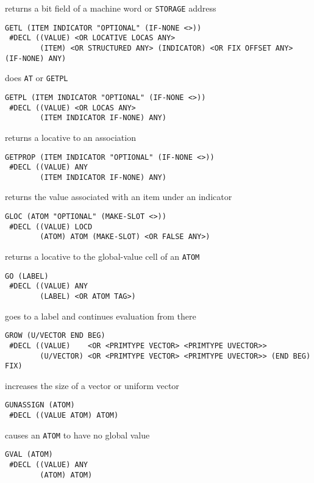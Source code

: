 \documentclass[a4paper,]{article}
\begin{document}
returns a bit field of a machine word or \texttt{STORAGE} address

\begin{verbatim}
GETL (ITEM INDICATOR "OPTIONAL" (IF-NONE <>))
 #DECL ((VALUE) <OR LOCATIVE LOCAS ANY>
        (ITEM) <OR STRUCTURED ANY> (INDICATOR) <OR FIX OFFSET ANY> (IF-NONE) ANY)
\end{verbatim}

does \texttt{AT} or \texttt{GETPL}

\begin{verbatim}
GETPL (ITEM INDICATOR "OPTIONAL" (IF-NONE <>))
 #DECL ((VALUE) <OR LOCAS ANY>
        (ITEM INDICATOR IF-NONE) ANY)
\end{verbatim}

returns a locative to an association

\begin{verbatim}
GETPROP (ITEM INDICATOR "OPTIONAL" (IF-NONE <>))
 #DECL ((VALUE) ANY
        (ITEM INDICATOR IF-NONE) ANY)
\end{verbatim}

returns the value associated with an item under an indicator

\begin{verbatim}
GLOC (ATOM "OPTIONAL" (MAKE-SLOT <>))
 #DECL ((VALUE) LOCD
        (ATOM) ATOM (MAKE-SLOT) <OR FALSE ANY>)
\end{verbatim}

returns a locative to the global-value cell of an \texttt{ATOM}

\begin{verbatim}
GO (LABEL)
 #DECL ((VALUE) ANY
        (LABEL) <OR ATOM TAG>)
\end{verbatim}

goes to a label and continues evaluation from there

\begin{verbatim}
GROW (U/VECTOR END BEG)
 #DECL ((VALUE)    <OR <PRIMTYPE VECTOR> <PRIMTYPE UVECTOR>>
        (U/VECTOR) <OR <PRIMTYPE VECTOR> <PRIMTYPE UVECTOR>> (END BEG) FIX)
\end{verbatim}

increases the size of a vector or uniform vector

\begin{verbatim}
GUNASSIGN (ATOM)
 #DECL ((VALUE ATOM) ATOM)
\end{verbatim}

causes an \texttt{ATOM} to have no global value

\begin{verbatim}
GVAL (ATOM)
 #DECL ((VALUE) ANY
        (ATOM) ATOM)
\end{verbatim}
\end{document}
